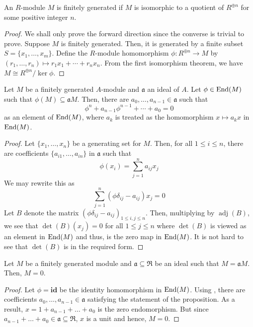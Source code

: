 \begin{proposition}
    An $R$-module $M$ is finitely generated if $M$ is isomorphic to a quotient of $R^{\oplus n}$ for some positive integer $n$.
\end{proposition}
\begin{proof}
    We shall only prove the forward direction since the converse is trivial to prove. Suppose $M$ is finitely generated. Then, it is generated by a finite subset $S = \{x_1,\ldots,x_m\}$. Define the $R$-module homomorphism $\phi:R^{\oplus n}\to M$ by $(r_1,\ldots,r_n)\mapsto r_1x_1 + \cdots + r_nx_n$. From the first isomorphism theorem, we have $M\cong R^{\oplus n}/\ker\phi$.
\end{proof}

\begin{proposition}
    Let $M$ be a finitely generated $A$-module and $\mathfrak a$ an ideal of $A$. Let $\phi\in\operatorname{End}(M)$ such that $\phi(M)\subseteq\mathfrak aM$. Then, there are $a_0,\ldots,a_{n - 1}\in\mathfrak a$ such that 
    \begin{equation*}
        \phi^n + a_{n - 1}\phi^{n - 1} + \cdots + a_0 = 0
    \end{equation*}
    as an element of $\operatorname{End}(M)$, where $a_k$ is treated as the homomorphism $x\mapsto a_kx$ in $\operatorname{End}(M)$.
\end{proposition}
\begin{proof}
    Let $\{x_1,\ldots,x_n\}$ be a generating set for $M$. Then, for all $1\le i\le n$, there are coefficients $\{a_{i1},\ldots,a_{in}\}$ in $\mathfrak a$ such that 
    \begin{equation*}
        \phi(x_i) = \sum_{j = 1}^n a_{ij}x_j
    \end{equation*}
    We may rewrite this as 
    \begin{equation*}
        \sum_{j = 1}^n(\phi\delta_{ij} - a_{ij})x_j = 0
    \end{equation*}
    Let $B$ denote the matrix $(\phi\delta_{ij} - a_{ij})_{1\le i,j\le n}$. Then, multiplying by $\operatorname{adj}(B)$, we see that $\det(B)(x_j) = 0$ for all $1\le j\le n$ where $\det(B)$ is viewed as an element in $\operatorname{End}(M)$ and thus, is the zero map in $\operatorname{End}(M)$. It is not hard to see that $\det(B)$ is in the required form.
\end{proof}

\begin{lemma}[Nakayama]
    Let $M$ be a finitely generated module and $\mathfrak a\subseteq\mathfrak R$ be an ideal such that $M = \mathfrak aM$. Then, $M = 0$. 
\end{lemma}
\begin{proof}
    Let $\phi = \mathbf{id}$ be the identity homomorphism in $\operatorname{End}(M)$. Using , there are coefficients $a_0,\ldots,a_{n - 1}\in\mathfrak a$ satisfying the statement of the proposition. As a result, $x = 1 + a_{n - 1} + \ldots + a_0$ is the zero endomorphism. But since $a_{n - 1} + \ldots + a_0\in\mathfrak a\subseteq\mathfrak R$, $x$ is a unit and hence, $M = 0$.
\end{proof}

